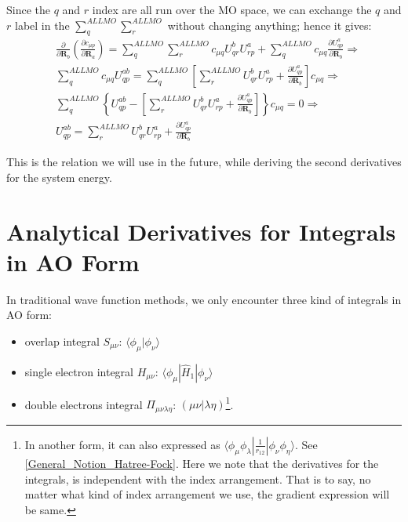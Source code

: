 Since the $q$ and $r$ index are all run over the MO space, we can exchange the
$q$ and $r$ label in the $\sum_{q}^{ALL MO}\sum_{r}^{ALL MO}$ without changing
anything; hence it gives:
\begin{equation}
 \begin{split}
  &\frac{\partial}{\partial\bm{R}_{b}} \left( \frac{\partial c_{\mu
p}}{\partial\bm{R}_{a}}\right)  = \sum_{q}^{ALL MO}\sum_{r}^{ALL MO}c_{\mu
q}U^{b}_{qr}U^{a}_{rp} + \sum_{q}^{ALL
MO}c_{\mu q}\frac{\partial U^{a}_{qp}}{\partial\bm{R}_{b}} \Longrightarrow \\
 &\sum_{q}^{ALL MO}c_{\mu q}U^{ab}_{qp} = \sum_{q}^{ALL MO}\left[ 
\sum_{r}^{ALL MO}U^{b}_{qr}U^{a}_{rp} + \frac{\partial
U^{a}_{qp}}{\partial\bm{R}_{b}}
\right] c_{\mu q} \Longrightarrow \\
&\sum_{q}^{ALL MO}\left\lbrace U^{ab}_{qp} - \left[ 
\sum_{r}^{ALL MO}U^{b}_{qr}U^{a}_{rp} + \frac{\partial
U^{a}_{qp}}{\partial\bm{R}_{b}}
\right]\right\rbrace  c_{\mu q}  = 0 \Longrightarrow \\
&U^{ab}_{qp}  =
\sum_{r}^{ALL MO}U^{b}_{qr}U^{a}_{rp} + \frac{\partial
U^{a}_{qp}}{\partial\bm{R}_{b}}
 \end{split}
\label{orbital_response_gradient_eq:12}
\end{equation}

This is the relation we will use in the future, while deriving the second
derivatives for the system energy.

\section{Analytical Derivatives for Integrals in AO Form}
%
%
%
%
In traditional wave function methods, we only encounter three kind of integrals
in AO form:
\begin{itemize}
 \item overlap integral $S_{\mu\nu}$: $\langle\phi_{\mu}|\phi_{\nu}\rangle$ 
 \item single electron integral $H_{\mu\nu}$:
$\langle\phi_{\mu}|\hat{H}_{1}|\phi_{\nu}\rangle$
 \item double electrons integral $\Pi_{\mu\nu\lambda\eta}$:
$(\mu\nu|\lambda\eta)$\footnote{ In another form, it can also expressed
as $\langle\phi_{\mu}\phi_{\lambda}|\frac{1}{r_{12}}|\phi_{\nu}\phi_{\eta}
\rangle$. See \ref{General_Notion_Hatree-Fock}. Here we note that the
derivatives for the integrals, is independent with the index arrangement.
That is to say,  no matter what kind of index arrangement we use, the gradient
expression will be same.}.
\end{itemize}

